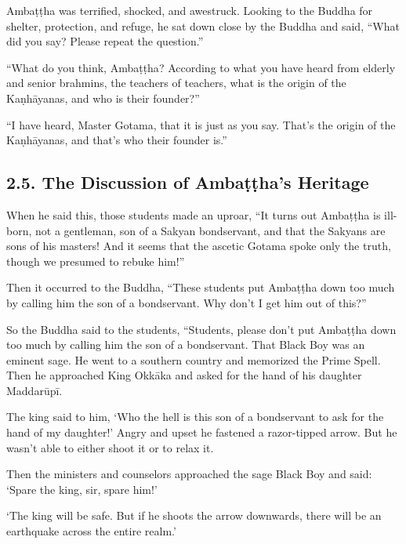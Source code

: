 \documentclass[12pt,openany]{book}%
\begin{document}
\textsanskrit{Ambaṭṭha} was terrified, shocked, and awestruck. Looking to the Buddha for shelter, protection, and refuge, he sat down close by the Buddha and said, “What did you say? Please repeat the question.” 

“What do you think, \textsanskrit{Ambaṭṭha}? According to what you have heard from elderly and senior brahmins, the teachers of teachers, what is the origin of the \textsanskrit{Kaṇhāyanas}, and who is their founder?” 

“I have heard, Master Gotama, that it is just as you say. That’s the origin of the \textsanskrit{Kaṇhāyanas}, and that’s who their founder is.” 

\subsection*{2.5. The Discussion of \textsanskrit{Ambaṭṭha}’s Heritage }

When he said this, those students made an uproar, “It turns out \textsanskrit{Ambaṭṭha} is ill-born, not a gentleman, son of a Sakyan bondservant, and that the Sakyans are sons of his masters! And it seems that the ascetic Gotama spoke only the truth, though we presumed to rebuke him!” 

Then it occurred to the Buddha, “These students put \textsanskrit{Ambaṭṭha} down too much by calling him the son of a bondservant. Why don’t I get him out of this?” 

So the Buddha said to the students, “Students, please don’t put \textsanskrit{Ambaṭṭha} down too much by calling him the son of a bondservant. That Black Boy was an eminent sage. He went to a southern country and memorized the Prime Spell. Then he approached King \textsanskrit{Okkāka} and asked for the hand of his daughter \textsanskrit{Maddarūpī}. 

The king said to him, ‘Who the hell is this son of a bondservant to ask for the hand of my daughter!’ Angry and upset he fastened a razor-tipped arrow. But he wasn’t able to either shoot it or to relax it. 

Then the ministers and counselors approached the sage Black Boy and said: ‘Spare the king, sir, spare him!’ 

‘The king will be safe. But if he shoots the arrow downwards, there will be an earthquake across the entire realm.’ 
\end{document}
